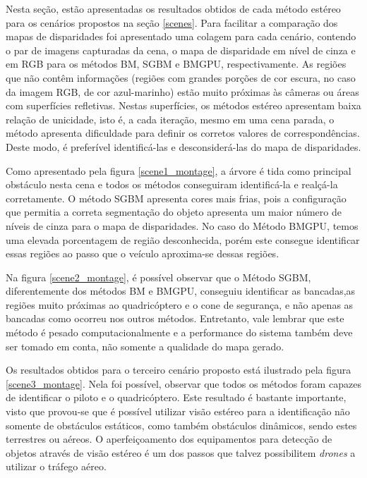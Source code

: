 Nesta seção, estão apresentadas os resultados obtidos de cada método estéreo para os cenários propostos na seção \ref{scenes}. Para facilitar a comparação dos mapas de disparidades foi apresentado uma colagem para cada cenário, contendo o par de imagens capturadas da cena, o mapa de disparidade em nível de cinza e em RGB para os métodos BM, SGBM e BMGPU, respectivamente. As regiões que não contêm informações (regiões com grandes porções de cor escura, no caso da imagem RGB, de cor azul-marinho) estão muito próximas às câmeras ou áreas com superfícies refletivas. Nestas superfícies, os métodos estéreo apresentam baixa relação de unicidade, isto é, a cada iteração, mesmo em uma cena parada, o método apresenta dificuldade para definir os corretos valores de correspondências. Deste modo, é preferível identificá-las e desconsiderá-las do mapa de disparidades.

Como apresentado pela figura \ref{scene1_montage}, a árvore é tida como principal obstáculo nesta cena e todos os métodos conseguiram identificá-la e realçá-la corretamente. O método SGBM apresenta cores mais frias, pois a configuração que permitia a correta segmentação do objeto apresenta um maior número de níveis de cinza para o mapa de disparidades. No caso do Método BMGPU, temos uma elevada porcentagem de região desconhecida, porém este consegue identificar essas regiões ao passo que o veículo aproxima-se dessas regiões. 

Na figura \ref{scene2_montage}, é possível observar que o Método SGBM, diferentemente dos métodos BM e BMGPU, conseguiu identificar as bancadas,as regiões muito próximas ao quadricóptero e o cone de segurança, e não apenas as bancadas como ocorreu nos outros métodos. Entretanto, vale lembrar que este método é pesado computacionalmente e a performance do sistema também deve ser tomado em conta, não somente a qualidade do mapa gerado. 

Os resultados obtidos para o terceiro cenário proposto está ilustrado pela figura \ref{scene3_montage}. Nela foi possível, observar que todos os métodos foram capazes de identificar o piloto e o quadricóptero. Este resultado é bastante importante, visto que provou-se que é possível utilizar visão estéreo para a identificação não somente de obstáculos estáticos, como também obstáculos dinâmicos, sendo estes terrestres ou aéreos. O aperfeiçoamento dos equipamentos para detecção de objetos através de visão estéreo é um dos passos que talvez possibilitem \textit{drones} a utilizar o tráfego aéreo. 

